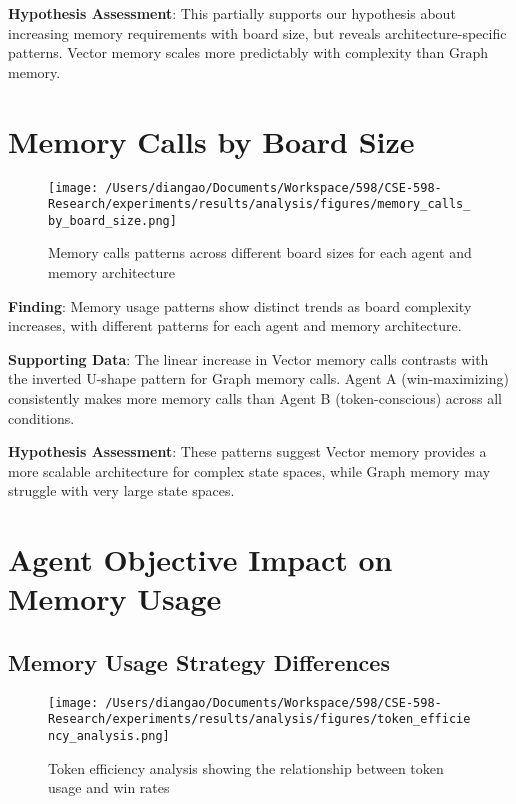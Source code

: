 \documentclass[10pt]{article}
\begin{document}
\textbf{Hypothesis Assessment}: This partially supports our hypothesis about increasing memory requirements with board size, but reveals architecture-specific patterns. Vector memory scales more predictably with complexity than Graph memory.

\section{Memory Calls by Board Size}

\begin{figure}[t]
    \centering
    \texttt{[image: /Users/diangao/Documents/Workspace/598/CSE-598-Research/experiments/results/analysis/figures/memory\_calls\_by\_board\_size.png]}
    \caption{Memory calls patterns across different board sizes for each agent and memory architecture}
    \label{fig:memory_calls}
\end{figure}

\small
\textbf{Finding}: Memory usage patterns show distinct trends as board complexity increases, with different patterns for each agent and memory architecture.

\textbf{Supporting Data}: The linear increase in Vector memory calls contrasts with the inverted U-shape pattern for Graph memory calls. Agent A (win-maximizing) consistently makes more memory calls than Agent B (token-conscious) across all conditions.

\textbf{Hypothesis Assessment}: These patterns suggest Vector memory provides a more scalable architecture for complex state spaces, while Graph memory may struggle with very large state spaces.

\section{Agent Objective Impact on Memory Usage}

\subsection{Memory Usage Strategy Differences}

\begin{figure}[t]
    \centering
    \texttt{[image: /Users/diangao/Documents/Workspace/598/CSE-598-Research/experiments/results/analysis/figures/token\_efficiency\_analysis.png]}
    \caption{Token efficiency analysis showing the relationship between token usage and win rates}
    \label{fig:token_efficiency_1}
\end{figure}
\end{document}
